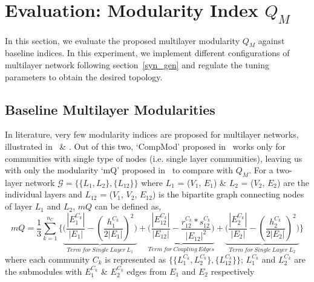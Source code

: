\section{Evaluation: Modularity Index $Q_M$}\label{ev_metric}
In this section, we evaluate the proposed multilayer modularity $Q_M$ against baseline indices. In this experiment, we implement
different configurations of multilayer network following section~\ref{syn_gen} and regulate the tuning parameters to obtain
the desired topology.

\subsection{Baseline Multilayer Modularities}
In literature, very few modularity indices are proposed for multilayer networks, illustrated in~\cite{CompMod} \& \cite{medical_paper}.
Out of this two, `CompMod' proposed in~\cite{CompMod}
works only for communities with single type of nodes (i.e. single layer communities), leaving us with only the modularity `mQ' proposed
in~\cite{medical_paper} to compare with $Q_M$.
For a two-layer network $\mathcal{G} = \{\{L_1, L_2\}, \{L_{12}\}\}$ where $L_1$ = ($V_1$, $E_1$) \& $L_2$ = ($V_2$, $E_2$) are the
individual layers and $L_{12}$ = ($V_1$, $V_2$, $E_{12}$) is the bipartite graph connecting nodes of layer $L_1$ and $L_2$,
$mQ$ can be defined as, %
\vspace{-0.1in}
\begin{dmath}\label{eq_mQ}
 {mQ=\frac{1}{3}\sum_{k=1}^{n_C} \bigg \{
 \underbrace{\big(\frac{\left \vert E^{C_k}_1 \right \vert}{\left \vert E_1 \right \vert}-
 (\frac{h^{C_k}_1}{2\left \vert E_1 \right \vert})^2\big)}_{Term~ for~ Single~ Layer~ L_1}}
 +{\underbrace{\big(\frac{\left \vert E^{C_k}_{12} \right \vert}{\left \vert E_{12} \right \vert}-
 \frac{r^{C_k}_{12}*{s^{C_k}_{12}}}{{\left \vert E_{12} \right \vert}^2}\big)}_{Term~ for~ Coupling~ Edges}
 +\underbrace{\big(\frac{\left \vert E^{C_k}_2 \right \vert}{\left \vert E_2 \right \vert}-(\frac{h^{C_k}_2}{2\left \vert
 E_2 \right \vert})^2\big)}_{Term~ for~ Single~ Layer~ L_2} \bigg\}}
\end{dmath}
\vspace{-0.1in}
where each community ${C_k}$ 
is represented as $\{\{L^{C_k}_1, L^{C_k}_2\}, 
\{L^{C_k}_{12}\}\}$;
$L^{C_k}_1$ and $L^{C_k}_2$ are the submodules with $E^{C_k}_1$ \& $E^{C_k}_2$ edges from $E_1$ and $E_2$ respectively
